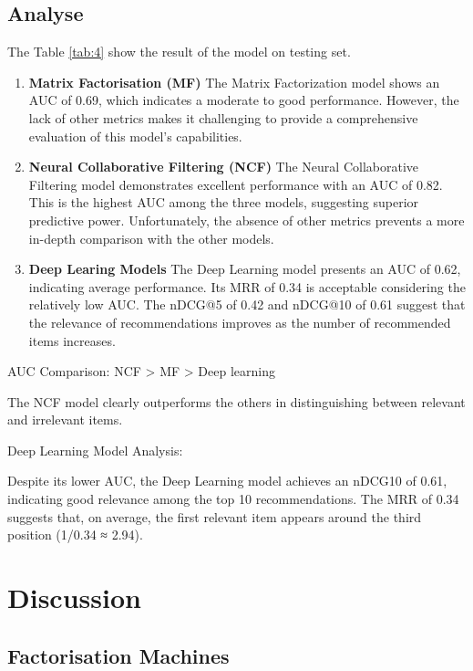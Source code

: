 \documentclass[9pt,twocolumn,twoside,lineno]{gsajnl}
\begin{document}
\subsection{Analyse}
The Table \ref{tab:4} show the result of the model on testing set.
\begin{enumerate}
    
\item \textbf{Matrix Factorisation (MF)\newline}
The Matrix Factorization model shows an AUC of 0.69, which indicates a moderate to good performance. However, the lack of other metrics makes it challenging to provide a comprehensive evaluation of this model's capabilities.
\item \textbf{Neural Collaborative Filtering (NCF)\newline}
The Neural Collaborative Filtering model demonstrates excellent performance with an AUC of 0.82. This is the highest AUC among the three models, suggesting superior predictive power. Unfortunately, the absence of other metrics prevents a more in-depth comparison with the other models.
\item \textbf{Deep Learing Models\newline}
The Deep Learning model presents an AUC of 0.62, indicating average performance. Its MRR of 0.34 is acceptable considering the relatively low AUC. The nDCG@5 of 0.42 and nDCG@10 of 0.61 suggest that the relevance of recommendations improves as the number of recommended items increases.
\end{enumerate}

AUC Comparison: NCF > MF > Deep learning

The NCF model clearly outperforms the others in distinguishing between relevant and irrelevant items.

Deep Learning Model Analysis:

Despite its lower AUC, the Deep Learning model achieves an nDCG\@10 of 0.61, indicating good relevance among the top 10 recommendations. The MRR of 0.34 suggests that, on average, the first relevant item appears around the third position (1/0.34 ≈ 2.94).

\section{Discussion}
\subsection{Factorisation Machines}
\end{document}
